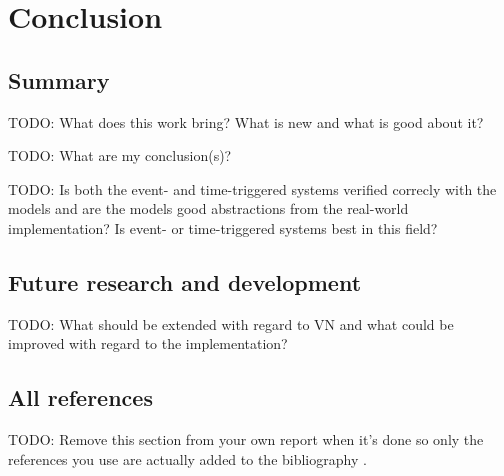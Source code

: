 \chapter{Conclusion}
\section{Summary}
TODO: What does this work bring? What is new and what is good about it?

TODO: What are my conclusion(s)?

TODO: Is both the event- and time-triggered systems verified correcly with the
models and are the models good abstractions from the real-world implementation?
Is event- or time-triggered systems best in this field?

\section{Future research and development}
TODO: What should be extended with regard to VN and what could be improved with
regard to the implementation?

\section{All references}
TODO: Remove this section from your own report when it's done so only the
references you use are actually added to the bibliography \cite{*}.
